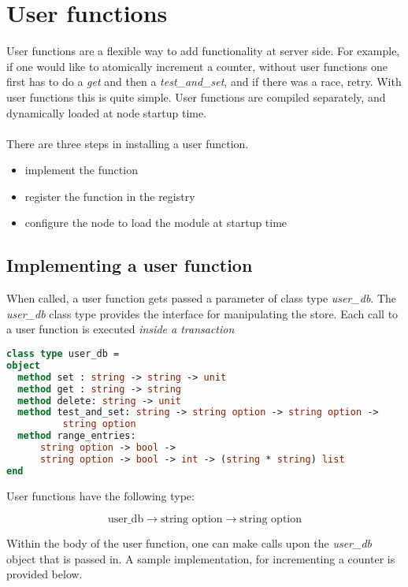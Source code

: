 \section{User functions}\label{user_functions}
User functions are a flexible way to add functionality at server side.
For example, if one would like to atomically increment a counter, 
without user functions one first has to do a \emph{get} 
and then a \emph{test\_and\_set}, and if there was a race, retry.
With user functions this is quite simple. 
User functions are compiled separately, and dynamically loaded at node startup time.
\paragraph{}
There are three steps in installing a user function.
\begin{itemize}
\item{implement the function}
\item{register the function in the registry}
\item{configure the node to load the module at startup time}
\end{itemize}


\subsection{Implementing a user function}
When called, a user function gets passed a parameter of class type \emph{user\_db}.
The \emph{user\_db} class type provides the interface for manipulating the store. 
Each call to a user function is executed \emph{inside a transaction}

\begin{lstlisting}[language=Caml]
class type user_db = 
object 
  method set : string -> string -> unit
  method get : string -> string
  method delete: string -> unit
  method test_and_set: string -> string option -> string option -> 
          string option
  method range_entries: 
      string option -> bool -> 
      string option -> bool -> int -> (string * string) list 
end

\end{lstlisting}

User functions have the following type:

$$
\text{user\_db} \rightarrow 
\text{string option} \rightarrow \text{string option} 
$$

Within the body of the user function, 
one can make calls upon the \emph{user\_db} object that is passed in.
A sample implementation, for incrementing a counter is provided below.

